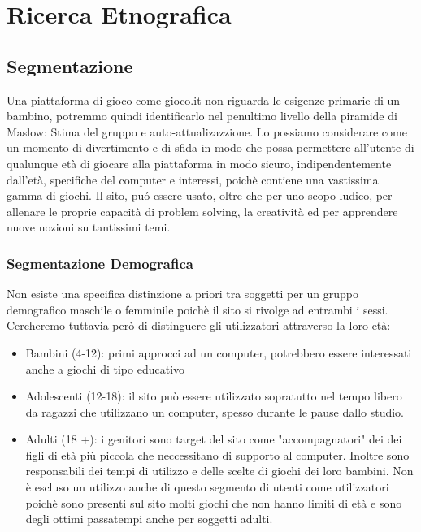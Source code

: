 \documentclass[../Report.tex]{subfiles}
\begin{document}
    \chapter{Ricerca Etnografica}
    \label{chapter:ricerca etnografica}
    \section{Segmentazione}
    Una piattaforma di gioco come gioco.it non riguarda le esigenze primarie di un bambino, potremmo quindi  identificarlo nel penultimo livello della piramide di Maslow: Stima del gruppo e auto-attualizazzione.
    Lo possiamo considerare come un momento di divertimento e di sfida in modo che possa permettere all’utente di qualunque età di giocare alla piattaforma in modo sicuro, indipendentemente dall’età, specifiche del computer e interessi, poichè contiene una vastissima gamma di giochi. 
    Il sito, puó essere usato, oltre che per uno scopo ludico, per allenare le proprie capacità di problem solving, la creatività ed per apprendere nuove nozioni su tantissimi temi.

    \subsection{Segmentazione Demografica}
    
    Non esiste una specifica distinzione a priori tra soggetti per un gruppo demografico maschile o femminile poichè il sito si rivolge ad entrambi i sessi. Cercheremo tuttavia però di distinguere gli utilizzatori attraverso la loro età:
    \begin{itemize}
        \item Bambini (4-12): primi approcci ad un computer, potrebbero essere interessati anche a giochi di tipo educativo
        \item Adolescenti (12-18): il sito può essere utilizzato sopratutto nel tempo libero da ragazzi che utilizzano un computer, spesso durante le pause dallo studio. 
        \item Adulti (18 +): i genitori sono target del sito come "accompagnatori" dei dei figli di età più piccola che neccessitano di supporto al computer. Inoltre sono responsabili dei tempi di utilizzo e delle scelte di giochi dei loro bambini. Non è escluso un utilizzo anche di questo segmento di utenti come utilizzatori poichè sono presenti sul sito molti giochi che non hanno limiti di età e sono degli ottimi passatempi anche per soggetti adulti. 
    \end{itemize}
\end{document}
